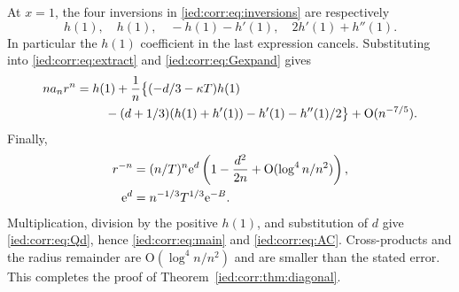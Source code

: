 \documentclass[11pt,letterpaper]{article}
\theoremstyle{remark}\newtheorem{remark}[theorem]{Remark}
\newcommand{\Oh}{\mathrm O}\newcommand{\supp}{\operatorname{supp}}
\begin{document}
At $x=1$, the four inversions in \eqref{ied:corr:eq:inversions} are respectively
\[
 h(1),\quad h(1),\quad -h(1)-h'(1),\quad 2h'(1)+h''(1).
\]
In particular the $h(1)$ coefficient in the last expression cancels. Substituting into \eqref{ied:corr:eq:extract} and \eqref{ied:corr:eq:Gexpand} gives
\begin{align}\label{ied:corr:eq:coefficientcorrected}
 n a_n r^n={}&h(1)+\frac1n\bigl\{(-d/3-\kappa T)h(1)\notag\\
 &\hspace{1em}-(d+1/3)(h(1)+h'(1))-h'(1)-h''(1)/2\bigr\}
 +\Oh(n^{-7/5}).
\end{align}
Finally,
\begin{align*}
 r^{-n}&=(n/T)^n\e^d\left(1-\frac{d^2}{2n}
                         +\Oh(\log^4n/n^2)\right),\\
 \e^d&=n^{-1/3}T^{1/3}\e^{-B}.
\end{align*}
Multiplication, division by the positive $h(1)$, and substitution of $d$ give \eqref{ied:corr:eq:Qd}, hence \eqref{ied:corr:eq:main} and \eqref{ied:corr:eq:AC}. Cross-products and the radius remainder are $\Oh(\log^4n/n^2)$ and are smaller than the stated error. This completes the proof of Theorem~\ref{ied:corr:thm:diagonal}.
\end{document}

